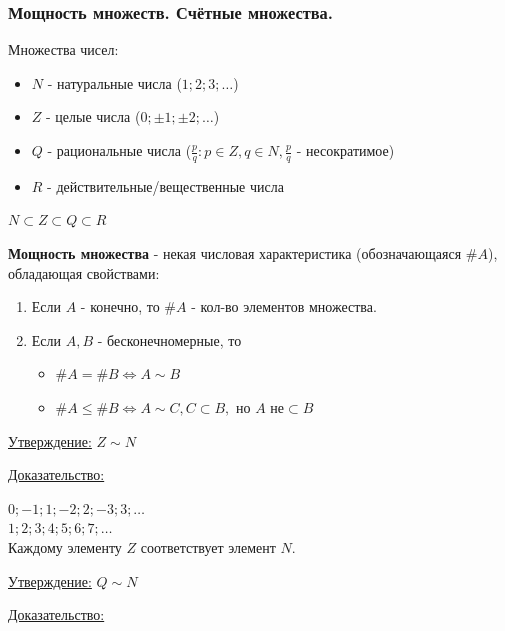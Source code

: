 \documentclass[12pt]{article}
\begin{document}
    \subsubsection*{Мощность множеств. Счётные множества.}
    Множества чисел:
    \begin{itemize}
        \item $N$ - натуральные числа ($1;2;3;\dots$)
        \item $Z$ - целые числа ($0;\pm1;\pm2;\dots$)
        \item $Q$ - рациональные числа ($\frac{p}{q} : p \in Z, q \in N, \frac{p}{q}$ - несократимое)
        \item $R$ - действительные/вещественные числа
    \end{itemize}
    $N \subset Z \subset Q \subset R$\par
    \noindent \textbf{Мощность множества} - некая числовая характеристика (обозначающаяся $\#A$), обладающая свойствами:
    \begin{enumerate}
        \item Если $A$ - конечно, то $\#A$ - кол-во элементов множества.
        \item Если $A,B$ - бесконечномерные, то \begin{itemize}
            \item $\#A = \#B \Longleftrightarrow A \sim B$
            \item $\#A \le \#B \Longleftrightarrow A \sim C, C \subset B, \text{ но } A \text{ не} \subset B$
        \end{itemize}
    \end{enumerate}
    \underline{Утверждение:} $Z \sim N$\par\noindent
    \underline{Доказательство:}
    \begin{adjustwidth}{1.5em}{1.5em}
        $0;-1;1;-2;2;-3;3;\dots$\\
        $1;2;3;4;5;6;7;\dots$\\
        Каждому элементу $Z$ соответствует элемент $N$.        
    \end{adjustwidth}
    \noindent \underline{Утверждение:} $Q \sim N$\par\noindent
    \underline{Доказательство:}
\end{document}
